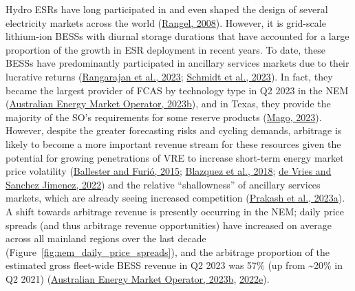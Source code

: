 \documentclass[12pt,a4paper,]{report}
\begin{document}
Hydro ESRs have long participated in and even shaped the design of
several electricity markets across the world
(\protect\hyperlink{ref-rangelCompetitionPolicyRegulation2008}{Rangel,
2008}). However, it is grid-scale lithium-ion BESSs with diurnal storage
durations that have accounted for a large proportion of the growth in
ESR deployment in recent years. To date, these BESSs have predominantly
participated in ancillary services markets due to their lucrative
returns
(\protect\hyperlink{ref-rangarajanAssessingImpactBattery2023}{Rangarajan
et al., 2023};
\protect\hyperlink{ref-schmidtMonetizingEnergyStorage2023}{Schmidt et
al., 2023}). In fact, they became the largest provider of FCAS by
technology type in Q2 2023 in the NEM
(\protect\hyperlink{ref-australianenergymarketoperatorQuarterlyEnergyDynamics2023a}{Australian
Energy Market Operator, 2023b}), and in Texas, they provide the majority
of the SO's requirements for some reserve products
(\protect\hyperlink{ref-magoERCOTOperationalExperience2023}{Mago,
2023}). However, despite the greater forecasting risks and cycling
demands, arbitrage is likely to become a more important revenue stream
for these resources given the potential for growing penetrations of VRE
to increase short-term energy market price volatility
(\protect\hyperlink{ref-ballesterEffectsRenewablesStylized2015}{Ballester
and Furió, 2015};
\protect\hyperlink{ref-blazquezRenewableEnergyPolicy2018}{Blazquez et
al., 2018}; \protect\hyperlink{ref-devriesMarketSignalsAdequacy2022}{de
Vries and Sanchez Jimenez, 2022}) and the relative ``shallowness'' of
ancillary services markets, which are already seeing increased
competition
(\protect\hyperlink{ref-prakashQuantifyingReserveCapabilities2023}{Prakash
et al., 2023a}). A shift towards arbitrage revenue is presently
occurring in the NEM; daily price spreads (and thus arbitrage revenue
opportunities) have increased on average across all mainland regions
over the last decade (Figure~\ref{fig:nem_daily_price_spreads}), and the
arbitrage proportion of the estimated gross fleet-wide BESS revenue in
Q2 2023 was 57\% (up from \textasciitilde20\% in Q2 2021)
(\protect\hyperlink{ref-australianenergymarketoperatorQuarterlyEnergyDynamics2023a}{Australian
Energy Market Operator, 2023b},
\protect\hyperlink{ref-australianenergymarketoperatorQuarterlyEnergyDynamics2022}{2022e}).
\end{document}
